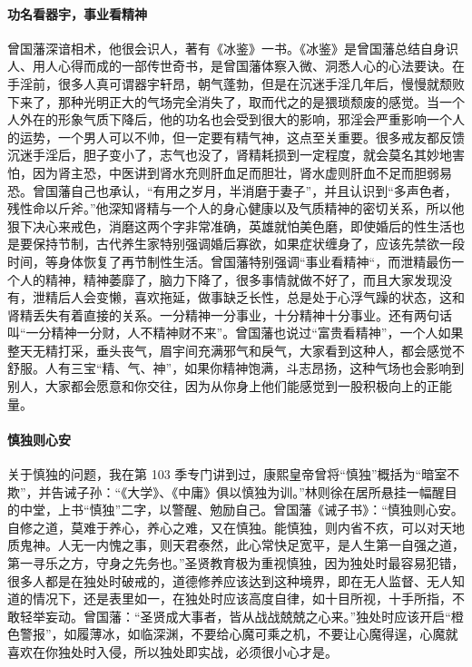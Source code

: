\paragraph{功名看器宇，事业看精神}

曾国藩深谙相术，他很会识人，著有《冰鉴》一书。《冰鉴》是曾国藩总结自身识人、用人心得而成的一部传世奇书，是曾国藩体察入微、洞悉人心的心法要诀。在手淫前，很多人真可谓器宇轩昂，朝气蓬勃，但是在沉迷手淫几年后，慢慢就颓败下来了，那种光明正大的气场完全消失了，取而代之的是猥琐颓废的感觉。当一个人外在的形象气质下降后，他的功名也会受到很大的影响，邪淫会严重影响一个人的运势，一个男人可以不帅，但一定要有精气神，这点至关重要。很多戒友都反馈沉迷手淫后，胆子变小了，志气也没了，肾精耗损到一定程度，就会莫名其妙地害怕，因为肾主恐，中医讲到肾水充则肝血足而胆壮，肾水虚则肝血不足而胆弱易恐。曾国藩自己也承认，“有用之岁月，半消磨于妻子”，并且认识到“多声色者，残性命以斤斧。”他深知肾精与一个人的身心健康以及气质精神的密切关系，所以他狠下决心来戒色，消磨这两个字非常准确，英雄就怕美色磨，即使婚后的性生活也是要保持节制，古代养生家特别强调婚后寡欲，如果症状缠身了，应该先禁欲一段时间，等身体恢复了再节制性生活。曾国藩特别强调“事业看精神“，而泄精最伤一个人的精神，精神萎靡了，脑力下降了，很多事情就做不好了，而且大家发现没有，泄精后人会变懒，喜欢拖延，做事缺乏长性，总是处于心浮气躁的状态，这和肾精丢失有着直接的关系。一分精神一分事业，十分精神十分事业。还有两句话叫“一分精神一分财，人不精神财不来”。曾国藩也说过“富贵看精神”，一个人如果整天无精打采，垂头丧气，眉宇间充满邪气和戾气，大家看到这种人，都会感觉不舒服。人有三宝“精、气、神”，如果你精神饱满，斗志昂扬，这种气场也会影响到别人，大家都会愿意和你交往，因为从你身上他们能感觉到一股积极向上的正能量。

\paragraph{慎独则心安}

关于慎独的问题，我在第 103 季专门讲到过，康熙皇帝曾将“慎独”概括为“暗室不欺”，并告诫子孙：“《大学》、《中庸》俱以慎独为训。”林则徐在居所悬挂一幅醒目的中堂，上书“慎独”二字，以警醒、勉励自己。曾国藩《诫子书》：“慎独则心安。自修之道，莫难于养心，养心之难，又在慎独。能慎独，则内省不疚，可以对天地质鬼神。人无一内愧之事，则天君泰然，此心常快足宽平，是人生第一自强之道，第一寻乐之方，守身之先务也。”圣贤教育极为重视慎独，因为独处时最容易犯错，很多人都是在独处时破戒的，道德修养应该达到这种境界，即在无人监督、无人知道的情况下，还是表里如一，在独处时应该高度自律，如十目所视，十手所指，不敢轻举妄动。曾国藩：“圣贤成大事者，皆从战战兢兢之心来。”独处时应该开启“橙色警报”，如履薄冰，如临深渊，不要给心魔可乘之机，不要让心魔得逞，心魔就喜欢在你独处时入侵，所以独处即实战，必须很小心才是。

